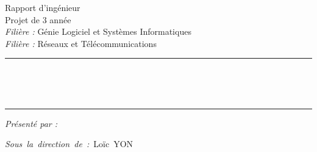 \begin{center}


	\Large
	Rapport d'ingénieur													\\
	Projet de 3 année											\\
	\textit{Filière :} Génie Logiciel et Systèmes Informatiques			\\
	\textit{Filière :} Réseaux et Télécommunications
	
	\rule{16cm}{2pt}													\\
	\vspace*{0.35cm}
	
	\huge
	\textbf{\@title}													\\

	\rule{16cm}{2pt}
	

\end{center}
	
\vspace*{\fill}

\begin{multicols}{2}
	\vspace*{\fill}
	\begin{flushleft}
	
	
		\begin{minipage}{0.7\textwidth} %
			\textit{Présenté par :} \@author
		\end{minipage}
		
		\mbox{\textit{Sous la direction de :} Loïc YON}
		
		
	\end{flushleft}
\columnbreak
	\vspace*{\fill}
	
	\begin{flushright}
	
		
		\@date
		
		
	\end{flushright}
\end{multicols}



\makeatother %
